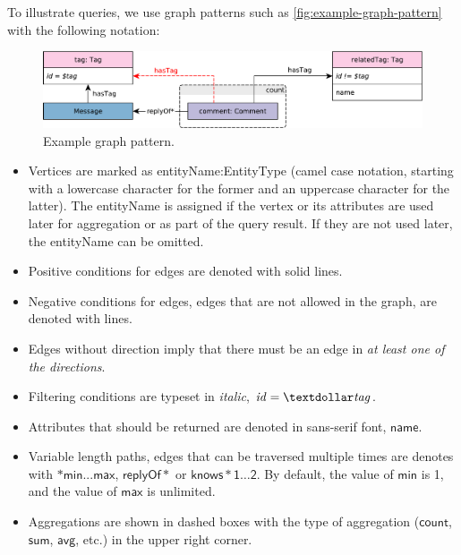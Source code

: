 To illustrate queries, we use graph patterns such as \autoref{fig:example-graph-pattern} with the following notation:

\begin{figure}[ht]
	\begin{center}
		\includegraphics[scale=\patternscale,margin=0cm .2cm]{patterns/bi-read-08}
		\caption{Example graph pattern.}
		\label{fig:example-graph-pattern}
	\end{center}
\end{figure}

\begin{itemize}
	\item Vertices are marked as \textsf{entityName:EntityType} (camel case notation, starting with a lowercase character for the former and an uppercase character for the latter). The \textsf{entityName} is assigned if the vertex or its attributes are used later for aggregation or as part of the query result. If they are not used later, the \textsf{entityName}  can be omitted.
	\item Positive conditions for edges are denoted with solid lines.
	\item Negative conditions for edges, \ie edges that are not allowed in the graph, are denoted with \textcolor{red}{} lines.
	\item Edges without direction imply that there must be an edge in \emph{at least one of the directions}.
	\item Filtering conditions are typeset in \textit{italic}, \eg $\mathit{id} = \mathit{\textdollar tag}$.
	\item Attributes that should be returned are denoted in sans-serif font, \eg $\mathsf{name}$.
	\item Variable length paths, \ie edges that can be traversed multiple times are denotes with $*\mathsf{min}...\mathsf{max}$, \eg $\mathsf{replyOf}*$ or $\mathsf{knows*1 \ldots 2}$. By default, the value of $\mathsf{min}$ is 1, and the value of $\mathsf{max}$ is unlimited.
	\item Aggregations are shown in dashed boxes with the type of aggregation ($\mathsf{count}$, $\mathsf{sum}$, $\mathsf{avg}$, etc.) in the upper right corner.
\end{itemize}

